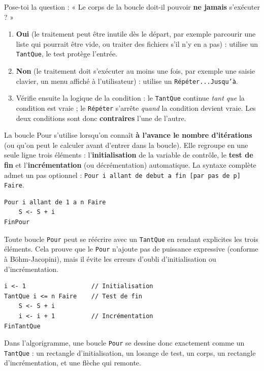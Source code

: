 \documentclass[11pt]{article}
\newcommand{\cle}[1]{{\popxbold\color{popdark}#1}}
\begin{document}
\begin{methode}
Pose-toi la question : « Le corps de la boucle doit-il pouvoir \textbf{ne jamais} s'exécuter ? »
\begin{enumerate}
\item \textbf{Oui} (le traitement peut être inutile dès le départ, par exemple parcourir une liste qui pourrait être vide, ou traiter des fichiers s'il n'y en a pas) : utilise un \texttt{TantQue}, le test protège l'entrée.
\item \textbf{Non} (le traitement doit s'exécuter au moins une fois, par exemple une saisie clavier, un menu affiché à l'utilisateur) : utilise un \texttt{Répéter...Jusqu'à}.
\item Vérifie ensuite la logique de la condition : le \texttt{TantQue} continue \emph{tant que} la condition est vraie ; le \texttt{Répéter} s'arrête \emph{quand} la condition devient vraie. Les deux conditions sont donc \textbf{contraires} l'une de l'autre.
\end{enumerate}
\end{methode}

\begin{definition}
La boucle \cle{Pour} s'utilise lorsqu'on connaît \textbf{à l'avance le nombre d'itérations} (ou qu'on peut le calculer avant d'entrer dans la boucle). Elle regroupe en une seule ligne trois éléments : l'\textbf{initialisation} de la variable de contrôle, le \textbf{test de fin} et l'\textbf{incrémentation} (ou décrémentation) automatique. La syntaxe complète admet un pas optionnel : \texttt{Pour i allant de debut a fin [par pas de p] Faire}.
\end{definition}

\begin{lstlisting}
Pour i allant de 1 a n Faire
    S <- S + i
FinPour
\end{lstlisting}

\begin{propriete}
Toute boucle \texttt{Pour} peut se réécrire avec un \texttt{TantQue} en rendant explicites les trois éléments. Cela prouve que le \texttt{Pour} n'ajoute pas de puissance expressive (conforme à Böhm-Jacopini), mais il évite les erreurs d'oubli d'initialisation ou d'incrémentation.
\begin{lstlisting}
i <- 1                  // Initialisation
TantQue i <= n Faire    // Test de fin
    S <- S + i
    i <- i + 1          // Incrémentation
FinTantQue
\end{lstlisting}
Dans l'algorigramme, une boucle \texttt{Pour} se dessine donc exactement comme un \texttt{TantQue} : un rectangle d'initialisation, un losange de test, un corps, un rectangle d'incrémentation, et une flèche qui remonte.
\end{propriete}
\end{document}
